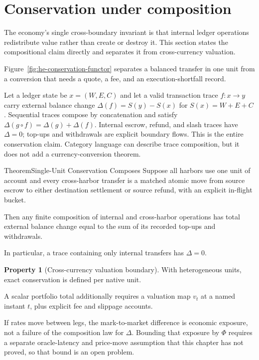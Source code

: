 \documentclass[11pt,a4paper]{article}
\theoremstyle{definition}
\newtheorem{property}{Property}[section]
\theoremstyle{definition}
\theoremstyle{remark}
\begin{document}
\section{Conservation under composition}\label{sec:conservation}

The economy's single cross-boundary invariant is that internal ledger operations
redistribute value rather than create or destroy it. This section states the
compositional claim directly and separates it from cross-currency valuation.

Figure~\ref{fig:he-conservation-functor} separates a balanced transfer in one
unit from a conversion that needs a quote, a fee, and an execution-shortfall record.



Let a ledger state be $x=(W,E,C)$ and let a valid transaction trace $f:x\to y$
carry external balance change $\Delta(f)=S(y)-S(x)$ for $S(x)=W+E+C$.
Sequential traces compose by concatenation and satisfy
$\Delta(g\circ f)=\Delta(g)+\Delta(f)$. Internal escrow, refund, and slash traces
have $\Delta=0$; top-ups and withdrawals are explicit boundary flows. This is the
entire conservation claim. Category language can describe trace composition, but
it does not add a currency-conversion theorem.

\begin{pdclaim}{Theorem}{Single-Unit Conservation Composes}
\setlength{\parskip}{4pt plus 1pt}
\label{thm:functor}
Suppose all harbors use one unit of account and every cross-harbor transfer is a
matched atomic move from source escrow to either destination settlement or source
refund, with an explicit in-flight bucket.

Then any finite composition of internal
and cross-harbor operations has total external balance change equal to the sum of
its recorded top-ups and withdrawals.

In particular, a trace containing only
internal transfers has $\Delta=0$.
\end{pdclaim}

\begin{property}[Cross-currency valuation boundary]\label{thm:lax}
\setlength{\parskip}{4pt plus 1pt}
With heterogeneous units, exact conservation is defined per native unit.

A scalar
portfolio total additionally requires a valuation map $v_t$ at a named instant
$t$, plus explicit fee and slippage accounts.

If rates move between legs, the
mark-to-market difference is economic exposure, not a failure of the composition law for $\Delta$.
Bounding that exposure by $\Phi$ requires a separate oracle-latency and price-move
assumption that this chapter has not proved, so that bound is an open problem.
\end{property}
\end{document}
